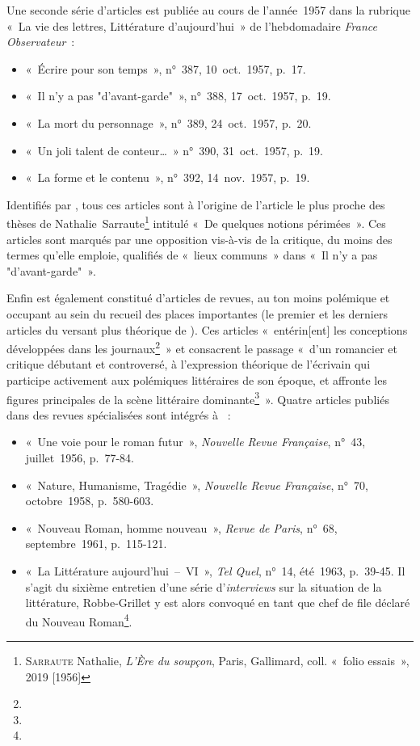 \documentclass[12pt, a4paper]{article}
\begin{document}
Une seconde série d'articles est publiée au cours de l'année~1957 dans la rubrique «~La vie des lettres, Littérature d’aujourd’hui~» de l'hebdomadaire \textit{France Observateur}~:
\begin{itemize}
    \item «~Écrire pour son temps~», n°~387, 10~oct.~1957, p.~17.
    \item «~Il n’y a pas "d’avant-garde"~», n°~388, 17~oct.~1957, p.~19.
    \item «~La mort du personnage~», n°~389, 24~oct.~1957, p.~20.
    \item «~Un joli talent de conteur…~» n°~390, 31~oct.~1957, p.~19.
    \item «~La forme et le contenu~», n°~392, 14~nov.~1957, p.~19.
\end{itemize}
Identifiés par \galia, tous ces articles sont à l'origine de l'article le plus proche des thèses de Nathalie~Sarraute\footnote{\textsc{Sarraute} Nathalie, \textit{L'Ère du soupçon}, Paris, Gallimard, coll. «~folio essais~», 2019 [1956]} intitulé «~De quelques notions périmées~». Ces articles sont marqués par une opposition vis-à-vis de la critique, du moins des termes qu'elle emploie, qualifiés de «~lieux communs~» dans «~Il n’y a pas "d’avant-garde"~».

Enfin \punr{} est également constitué d'articles de revues, au ton moins polémique et occupant au sein du recueil des places importantes (le premier et les derniers articles du versant plus théorique de \punr). Ces articles «~entérin[ent] les conceptions développées dans les journaux\footnote{}~» et consacrent le passage «~d’un romancier et critique débutant et controversé, à l’expression théorique de l’écrivain qui participe activement aux polémiques littéraires de son époque, et affronte les figures principales de la scène littéraire dominante\footnote{}~». Quatre articles publiés dans des revues spécialisées sont intégrés à \punr~:
\begin{itemize}
    \item «~Une voie pour le roman futur~», \textit{Nouvelle Revue Française}, n°~43, juillet~1956, p.~77-84.
    \item «~Nature, Humanisme, Tragédie~», \textit{Nouvelle Revue Française}, n°~70, octobre~1958, p.~580-603.
    \item «~Nouveau Roman, homme nouveau~», \textit{Revue de Paris}, n°~68, septembre~1961, p.~115-121.
    \item «~La Littérature aujourd'hui~–~VI~», \textit{Tel Quel}, n°~14, été~1963, p.~39-45. Il s'agit du sixième entretien d'une série d'\textit{interviews} sur la situation de la littérature, Robbe-Grillet y est alors convoqué en tant que chef de file déclaré du Nouveau Roman\footnote{}.
\end{itemize}
\end{document}
